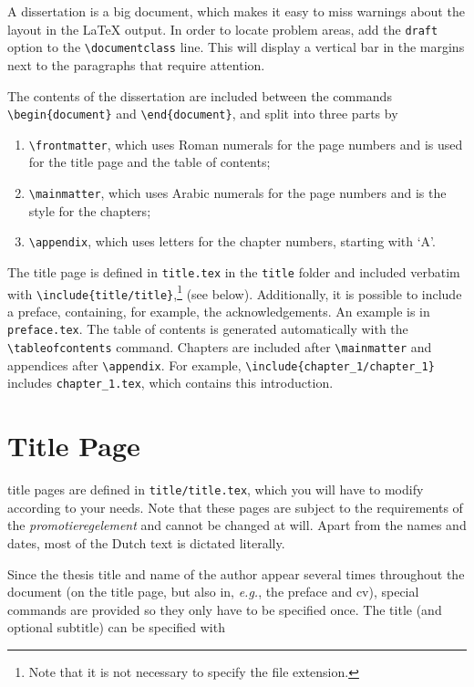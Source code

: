 A dissertation is a big document, which makes it easy to miss warnings about the layout in the \LaTeX{} output. In order to locate problem areas, add the \texttt{draft} option to the \texttt{\textbackslash documentclass} line. This will display a vertical bar in the margins next to the paragraphs that require attention.

The contents of the dissertation are included between the commands \texttt{\textbackslash begin\{document\}} and \texttt{\textbackslash end\{document\}}, and split into three parts by
\begin{enumerate}
	\item\texttt{\textbackslash frontmatter}, which uses Roman numerals for the page numbers and is used for the title page and the table of contents;
	\item\texttt{\textbackslash mainmatter}, which uses Arabic numerals for the page numbers and is the style for the chapters;
	\item\texttt{\textbackslash appendix}, which uses letters for the chapter numbers, starting with `A'.
\end{enumerate}
The title page is defined in \texttt{title.tex} in the \texttt{title} folder and included verbatim with \texttt{\textbackslash include\{title/title\}},\footnote{Note that it is not necessary to specify the file extension.} (see below). Additionally, it is possible to include a preface, containing, for example, the acknowledgements. An example is in \texttt{preface.tex}. The table of contents is generated automatically with the \texttt{\textbackslash tableofcontents} command. Chapters are included after \texttt{\textbackslash mainmatter} and appendices after \texttt{\textbackslash appendix}. For example, \texttt{\textbackslash include\{chapter\_1/chapter\_1\}} includes \texttt{chapter\_1.tex}, which contains this introduction.

\section{Title Page}

 title pages are defined in \texttt{title/title.tex}, which you will have to modify according to your needs. Note that these pages are subject to the requirements of the \emph{promotieregelement} and cannot be changed at will. Apart from the names and dates, most of the Dutch text is dictated literally.

Since the thesis title and name of the author appear several times throughout the document (on the title page, but also in, \emph{e.g.}, the preface and cv), special commands are provided so they only have to be specified once. The title (and optional subtitle) can be specified with

